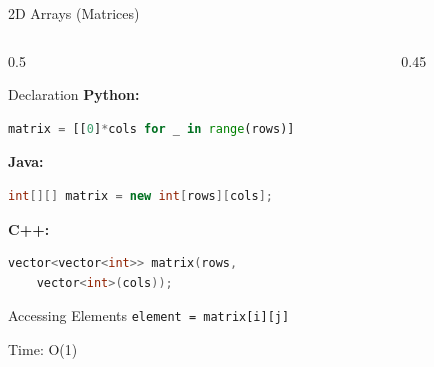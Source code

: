 \documentclass[aspectratio=169,xcolor=dvipsnames]{beamer}
\begin{document}
\begin{frame}[fragile]{2D Arrays (Matrices)}
  \begin{columns}
    \begin{column}{0.5\textwidth}
      \begin{exampleblock}{Declaration}
        \textbf{Python:}
        \begin{lstlisting}[language=Python,basicstyle=\tiny\ttfamily]
matrix = [[0]*cols for _ in range(rows)]
        \end{lstlisting}

        \textbf{Java:}
        \begin{lstlisting}[language=Java,basicstyle=\tiny\ttfamily]
int[][] matrix = new int[rows][cols];
        \end{lstlisting}

        \textbf{C++:}
        \begin{lstlisting}[language=C++,basicstyle=\tiny\ttfamily]
vector<vector<int>> matrix(rows,
    vector<int>(cols));
        \end{lstlisting}
      \end{exampleblock}

      \vspace{0.2cm}

      \begin{block}{Accessing Elements}
        \texttt{element = matrix[i][j]}

        Time: O(1)
      \end{block}
    \end{column}
    \begin{column}{0.45\textwidth}
    \end{column}
  \end{columns}
\end{frame}
\end{document}
